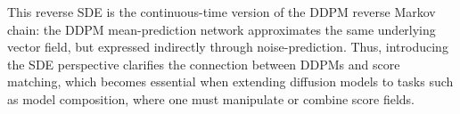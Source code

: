 This reverse SDE is the continuous-time version of the DDPM reverse Markov chain: the DDPM
mean-prediction network approximates the same underlying vector field, but expressed indirectly
through noise-prediction. Thus, introducing the SDE perspective clarifies the connection between
DDPMs and score matching, which becomes essential when extending diffusion models to tasks such as
model composition, where one must manipulate or combine score fields.



